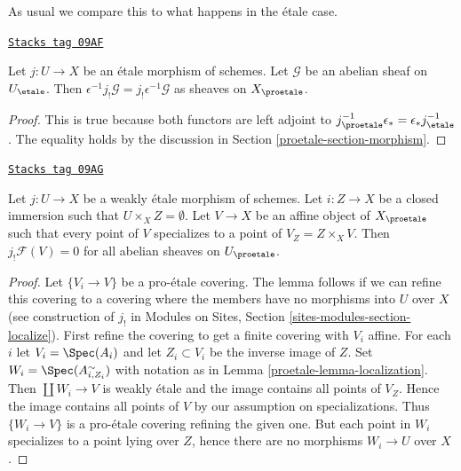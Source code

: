 As usual we compare this to what happens in the \'etale case.

\begin{lemma}
\label{proetale-lemma-jshriek-comparison}
\href{https://stacks.math.columbia.edu/tag/09AF}{\texttt{Stacks tag 09AF}}

Let $j : U \to X$ be an \'etale morphism of schemes.
Let $\mathcal{G}$ be an abelian sheaf on $U_\etale$.
Then $\epsilon^{-1} j_!\mathcal{G} = j_!\epsilon^{-1}\mathcal{G}$
as sheaves on $X_\proetale$.
\end{lemma}

\begin{proof}
This is true because both functors are left adjoint to
$j_\proetale^{-1} \epsilon_* = \epsilon_* j_\etale^{-1}$.
The equality holds by the discussion in Section \ref{proetale-section-morphism}.
\end{proof}

\begin{lemma}
\label{proetale-lemma-jshriek-zero}
\href{https://stacks.math.columbia.edu/tag/09AG}{\texttt{Stacks tag 09AG}}

Let $j : U \to X$ be a weakly \'etale morphism of schemes.
Let $i : Z \to X$ be a closed immersion such that $U \times_X Z = \emptyset$.
Let $V \to X$ be an affine object of $X_\proetale$ such that every point
of $V$ specializes to a point of $V_Z = Z \times_X V$.
Then $j_!\mathcal{F}(V) = 0$ for all abelian sheaves on $U_\proetale$.
\end{lemma}

\begin{proof}

Let $\{V_i \to V\}$ be a pro-\'etale covering. The lemma follows if we
can refine this covering to a covering where the members have no
morphisms into $U$ over $X$ (see construction of $j_!$ in
Modules on Sites, Section \ref{sites-modules-section-localize}).
First refine the covering to get a finite covering with $V_i$ affine.
For each $i$ let $V_i = \Spec(A_i)$ and let $Z_i \subset V_i$ be the
inverse image of $Z$.
Set $W_i = \Spec(A_{i, Z_i}^\sim)$ with notation as in
Lemma \ref{proetale-lemma-localization}.
Then $\coprod W_i \to V$ is weakly \'etale and the image contains all
points of $V_Z$. Hence the image contains all points of $V$ by
our assumption on specializations. Thus $\{W_i \to V\}$ is a
pro-\'etale covering refining the given one. But each point in $W_i$
specializes to a point lying over $Z$, hence there are no morphisms
$W_i \to U$ over $X$.
\end{proof}

